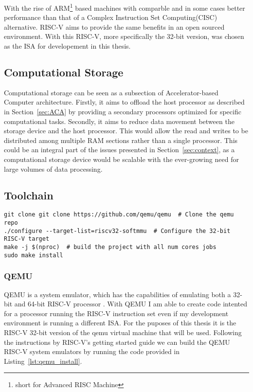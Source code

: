 With the rise of ARM\footnote{short for Advanced RISC Machine} based machines
with comparble and in some cases better performance than that of a Complex
Instruction Set Computing(CISC) alternative.\cite{Power_Struggle} RISC-V aims to
provide the same benefits in an open sourced environment. With this RISC-V, more
specifically the 32-bit version, was chosen as the ISA for developement in this
thesis.

\subsection{Computational Storage}
Computational storage can be seen as a subsection of Accelerator-based Computer
architecture. Firstly, it aims to offload the host processor as described in
Section~\ref{sec:ACA} by providing a secondary processors optimized for specific
computational tasks. Secondly, it aims to reduce data movement between the
storage device and the host processor. This would allow the read and writes to
be distributed among multiple RAM sections rather than a single processor. This
could be an integral part of the issues presented in Section~\ref{sec:context},
as a computational storage device would be scalable with the ever-growing need
for large volumes of data processing.


\subsection{Toolchain}
\begin{lstlisting}[caption=Installing QEMU, float=*, label=lst:qemu_install]
git clone git clone https://github.com/qemu/qemu  # Clone the qemu repo
./configure --target-list=riscv32-softmmu  # Configure the 32-bit RISC-V target
make -j $(nproc)  # build the project with all num cores jobs
sudo make install
\end{lstlisting}
\subsubsection{QEMU}
QEMU is a system emulator, which has the capabilities of emulating both a 32-bit
and 64-bit RISC-V processor \cite{QEMU}. With QEMU I am able to create code intented
for a processor running the RISC-V instruction set even if my development
environment is running a different ISA. For the puposes of this thesis it is the
RISC-V 32-bit version of the qemu virtual machine that will be used.
Following the instructions by RISC-V's getting started guide
we can build the QEMU RISC-V system emulators by running the code
provided in Listing~\ref{lst:qemu_install}\cite{RISC-V_GS}.

